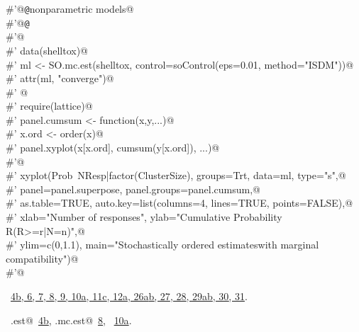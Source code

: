\documentclass[reqno]{amsart}
\renewcommand{\NWlink}[2]{\hyperlink{#1}{#2}}
\begin{document}
\begin{flushleft}
\begin{list}{}{}
\mbox{}\verb@#'@{\tt @}\verb@keywords nonparametric models@\\
\mbox{}\verb@#'@{\tt @}\verb@examples@\\
\mbox{}\verb@#'@\\
\mbox{}\verb@#'  data(shelltox)@\\
\mbox{}\verb@#'  ml <- SO.mc.est(shelltox, control=soControl(eps=0.01, method="ISDM"))@\\
\mbox{}\verb@#'  attr(ml, "converge")@\\
\mbox{}\verb@#'  @\\
\mbox{}\verb@#'  require(lattice)@\\
\mbox{}\verb@#'  panel.cumsum <- function(x,y,...){@\\
\mbox{}\verb@#'    x.ord <- order(x)@\\
\mbox{}\verb@#'    panel.xyplot(x[x.ord], cumsum(y[x.ord]), ...)}@\\
\mbox{}\verb@#'@\\
\mbox{}\verb@#'  xyplot(Prob~NResp|factor(ClusterSize), groups=Trt, data=ml, type="s",@\\
\mbox{}\verb@#'       panel=panel.superpose, panel.groups=panel.cumsum,@\\
\mbox{}\verb@#'       as.table=TRUE, auto.key=list(columns=4, lines=TRUE, points=FALSE),@\\
\mbox{}\verb@#'       xlab="Number of responses", ylab="Cumulative Probability R(R>=r|N=n)",@\\
\mbox{}\verb@#'       ylim=c(0,1.1), main="Stochastically ordered estimates\n with marginal compatibility")@\\
\mbox{}\verb@#'@\\
\mbox{}\verb@@{\NWsep}
\end{list}
\vspace{-1.5ex}
\footnotesize
\begin{list}{}{\setlength{\itemsep}{-\parsep}\setlength{\itemindent}{-\leftmargin}}
\item \NWtxtFileDefBy\ \NWlink{nuweb4b}{4b}\NWlink{nuweb6}{, 6}\NWlink{nuweb7}{, 7}\NWlink{nuweb8}{, 8}\NWlink{nuweb9}{, 9}\NWlink{nuweb10a}{, 10a}\NWlink{nuweb11c}{, 11c}\NWlink{nuweb12a}{, 12a}\NWlink{nuweb26a}{, 26a}\NWlink{nuweb26b}{b}\NWlink{nuweb27}{, 27}\NWlink{nuweb28}{, 28}\NWlink{nuweb29a}{, 29a}\NWlink{nuweb29b}{b}\NWlink{nuweb30}{, 30}\NWlink{nuweb31}{, 31}.
\item \NWtxtIdentsUsed\nobreak\  \verb@mc.est@\nobreak\ \NWlink{nuweb4b}{4b}, \verb@SO.mc.est@\nobreak\ \NWlink{nuweb8}{8}, \verb@soControl@\nobreak\ \NWlink{nuweb10a}{10a}.
\item{}
\end{list}
\vspace{4ex}
\end{flushleft}
\end{document}
